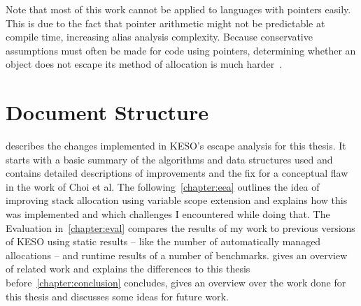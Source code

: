 		Note that most of this work cannot be applied to languages with pointers easily. This is due to the fact that
		pointer arithmetic might not be predictable at compile time, increasing alias analysis complexity. Because
		conservative assumptions must often be made for code using pointers, determining whether an object does not escape
		its method of allocation is much harder~\cite{horwitz:97:toplas, hind:99:toplas, landi:92:loplas,
		ramalingam:94:toplas}.

	\section{Document Structure}
		\label{sec:intro:document-structure}
		 describes the changes implemented in KESO's escape analysis for this thesis. It starts with
		a basic summary of the algorithms and data structures used and contains detailed descriptions of improvements and
		the fix for a conceptual flaw in the work of Choi et al. The following~\cref{chapter:eea} outlines the idea of
		improving stack allocation using variable scope extension and explains how this was implemented and which challenges
		I encountered while doing that. The Evaluation in~\cref{chapter:eval} compares the results of my work to previous
		versions of KESO using static results – like the number of automatically managed allocations – and runtime results
		of a number of benchmarks.  gives an overview of related work and explains the differences to this
		thesis before~\cref{chapter:conclusion} concludes, gives an overview over the work done for this thesis and
		discusses some ideas for future work.
